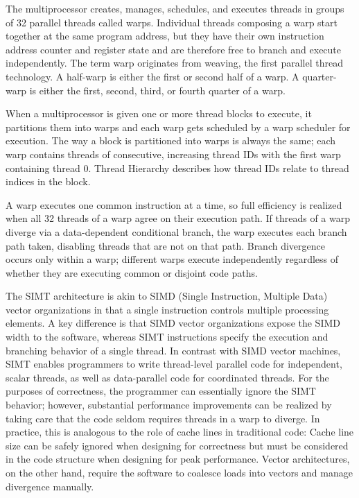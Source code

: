 The multiprocessor creates, manages, schedules, and executes threads in groups of 32 parallel threads called warps. Individual threads composing a warp start together at the same program address, but they have their own instruction address counter and register state and are therefore free to branch and execute independently. The term warp originates from weaving, the first parallel thread technology. A half-warp is either the first or second half of a warp. A quarter-warp is either the first, second, third, or fourth quarter of a warp.

When a multiprocessor is given one or more thread blocks to execute, it partitions them into warps and each warp gets scheduled by a warp scheduler for execution. The way a block is partitioned into warps is always the same; each warp contains threads of consecutive, increasing thread IDs with the first warp containing thread 0. Thread Hierarchy describes how thread IDs relate to thread indices in the block.

A warp executes one common instruction at a time, so full efficiency is realized when all 32 threads of a warp agree on their execution path. If threads of a warp diverge via a data-dependent conditional branch, the warp executes each branch path taken, disabling threads that are not on that path. Branch divergence occurs only within a warp; different warps execute independently regardless of whether they are executing common or disjoint code paths.

The SIMT architecture is akin to SIMD (Single Instruction, Multiple Data) vector organizations in that a single instruction controls multiple processing elements. A key difference is that SIMD vector organizations expose the SIMD width to the software, whereas SIMT instructions specify the execution and branching behavior of a single thread. In contrast with SIMD vector machines, SIMT enables programmers to write thread-level parallel code for independent, scalar threads, as well as data-parallel code for coordinated threads. For the purposes of correctness, the programmer can essentially ignore the SIMT behavior; however, substantial performance improvements can be realized by taking care that the code seldom requires threads in a warp to diverge. In practice, this is analogous to the role of cache lines in traditional code: Cache line size can be safely ignored when designing for correctness but must be considered in the code structure when designing for peak performance. Vector architectures, on the other hand, require the software to coalesce loads into vectors and manage divergence manually.